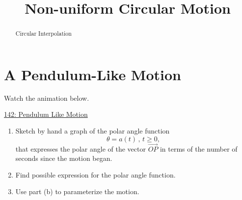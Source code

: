 \documentclass{ximera}
\title{Non-uniform Circular Motion}
\begin{document}
\begin{abstract}
Circular Interpolation
\end{abstract}
\maketitle


\section{A Pendulum-Like Motion}

\begin{question} \label{Q9Adfdsf}

Watch the animation below.

\begin{onlineOnly}
    \begin{center}
\end{center}
\end{onlineOnly}

\href{https://www.desmos.com/calculator/krsuq877va}{142: Pendulum Like Motion}

\begin{enumerate}
\item Sketch by hand a graph of the polar angle function 
\[
      \theta=a(t) \, , \, t\geq 0,
\]
that expresses the polar angle of the vector $\overrightarrow{OP}$ in terms of the number of seconds since the motion began.

\item Find possible expression for the polar angle function.

\item Use part (b) to parameterize the motion.
\end{enumerate}

\end{question}
\end{document}
